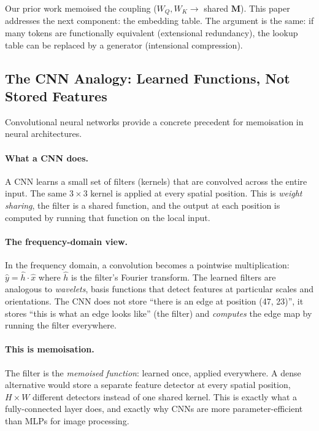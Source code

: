 \documentclass[11pt, a4paper]{article}
\newcommand{\M}{\mathbf{M}}
\theoremstyle{remark}
\begin{document}
Our prior work memoised the coupling ($W_Q, W_K \to $ shared $\M$).
This paper addresses the next component: the embedding table.
The argument is the same: if many tokens are functionally equivalent (extensional redundancy), the lookup table can be replaced by a generator (intensional compression).

\subsection{The CNN Analogy: Learned Functions, Not Stored Features}

Convolutional neural networks provide a concrete precedent for memoisation in neural architectures.

\paragraph{What a CNN does.}
A CNN learns a small set of filters (kernels) that are convolved across the entire input.
The same $3 \times 3$ kernel is applied at every spatial position.
This is \emph{weight sharing}, the filter is a shared function, and the output at each position is computed by running that function on the local input.

\paragraph{The frequency-domain view.}
In the frequency domain, a convolution becomes a pointwise multiplication: $\hat{y} = \hat{h} \cdot \hat{x}$ where $\hat{h}$ is the filter's Fourier transform.
The learned filters are analogous to \emph{wavelets}, basis functions that detect features at particular scales and orientations.
The CNN does not store ``there is an edge at position (47, 23)'', it stores ``this is what an edge looks like'' (the filter) and \emph{computes} the edge map by running the filter everywhere.

\paragraph{This is memoisation.}
The filter is the \emph{memoised function}: learned once, applied everywhere.
A dense alternative would store a separate feature detector at every spatial position, $H \times W$ different detectors instead of one shared kernel.
This is exactly what a fully-connected layer does, and exactly why CNNs are more parameter-efficient than MLPs for image processing.
\end{document}
